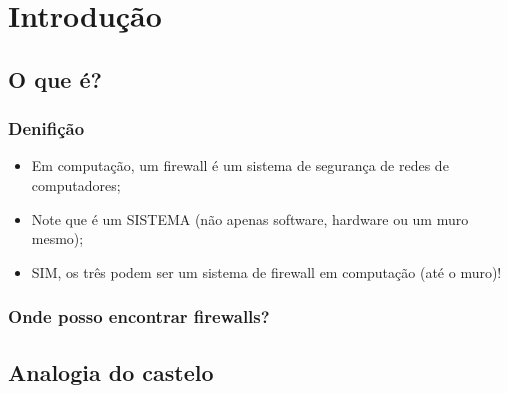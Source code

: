 \section{Introdução} 

\subsection{O que é?} %

\begin{frame}
\frametitle{Denifição}

\begin{itemize}
\item Em computação, um firewall é um sistema de segurança de redes de computadores;
\item Note que é um SISTEMA (não apenas software, hardware ou um muro mesmo);
\item SIM, os três podem ser um sistema de firewall em computação (até o muro)!
\end{itemize}

\end{frame}

\begin{frame}
\frametitle{Onde posso encontrar firewalls?}

\end{frame}


\subsection{Analogia do castelo}


